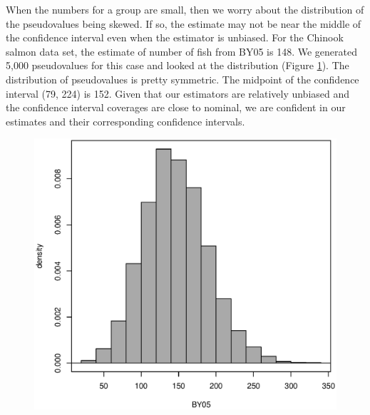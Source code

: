 \documentclass[12pt]{article}
\begin{document}
When the numbers for a group are small, then we worry about the distribution of the pseudovalues being skewed. If so, the estimate may not be near the middle of the confidence interval even when the estimator is unbiased. For the Chinook salmon data set, the estimate of number of fish from BY05 is 148. We generated 5,000 pseudovalues for this case  and looked at the distribution (Figure \ref{fig:CH11BY05}). The distribution of pseudovalues is pretty symmetric. The midpoint of the confidence interval (79, 224) is 152. Given that our estimators are relatively unbiased and the confidence interval coverages are close to nominal, we are confident in our estimates and their corresponding confidence intervals.

\begin{figure}[htbp]
\centering
\includegraphics[width=\textwidth]{./CH11BY05}
\caption{}
\label{fig:CH11BY05}
\end{figure}
\end{document}
